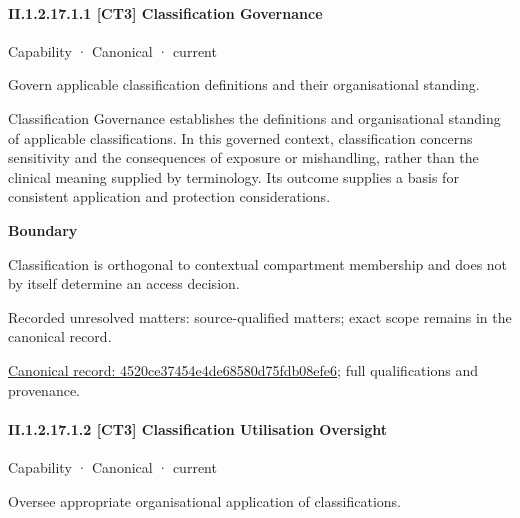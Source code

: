 \paragraph*{II.1.2.17.1.1 [CT3] Classification Governance}
\label{navigation:II.1.2.17.1.1}

\label{element:4520ce37454e4de68580d75fdb08efe6}
{\small Capability · Canonical · current}\par

Govern applicable classification definitions and their organisational standing.



Classification Governance establishes the definitions and organisational standing of applicable classifications. In this governed context, classification concerns sensitivity and the consequences of exposure or mishandling, rather than the clinical meaning supplied by terminology. Its outcome supplies a basis for consistent application and protection considerations.



\textbf{Boundary}



Classification is orthogonal to contextual compartment membership and does not by itself determine an access decision.


{\small Recorded unresolved matters: source-qualified matters; exact scope remains in the canonical record.}\par
{\footnotesize \href{../../../../continuum/strategy/capability/4520ce37454e4de68580d75fdb08efe6.md}{Canonical record: 4520ce37454e4de68580d75fdb08efe6}; full qualifications and provenance.}\par
\paragraph*{II.1.2.17.1.2 [CT3] Classification Utilisation Oversight}
\label{navigation:II.1.2.17.1.2}

\label{element:1d7c50aa80464613864dd6efb3fb56cc}
{\small Capability · Canonical · current}\par

Oversee appropriate organisational application of classifications.




